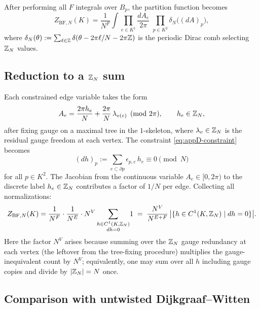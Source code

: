 \medskip

\noindent After performing all $F$ integrals over $B_p$, the partition function becomes
\begin{equation}\label{eq:appD-Z-after-B}
Z_{\mathrm{BF},N}(K)=\frac{1}{N^F}\int\prod_{e\in K^1}\frac{dA_e}{2\pi}\;\prod_{p\in K^2}\delta_{N}\!\bigl((dA)_p\bigr),
\end{equation}
where $\delta_N(\theta):=\sum_{\ell\in\mathbb{Z}}\delta(\theta-2\pi\ell/N-2\pi\mathbb{Z})$ is the periodic Dirac comb selecting $\mathbb{Z}_N$ values.

\subsection{Reduction to a \texorpdfstring{$\mathbb{Z}_N$}{Z\_N} sum}

Each constrained edge variable takes the form
\begin{equation}\label{eq:appD-ZN-parametrize}
A_e=\frac{2\pi h_e}{N}+\frac{2\pi}{N}\,\lambda_{v(e)}\pmod{2\pi},\qquad h_e\in\mathbb{Z}_N,
\end{equation}
after fixing gauge on a maximal tree in the $1$-skeleton, where $\lambda_v\in\mathbb{Z}_N$ is the residual gauge freedom at each vertex. The constraint \eqref{eq:appD-constraint} becomes
\begin{equation}\label{eq:appD-flat-ZN}
(dh)_p:=\sum_{e\subset\partial p}\epsilon_{p,e}\,h_e\equiv 0\pmod{N}
\end{equation}
for all $p\in K^2$. The Jacobian from the continuous variable $A_e\in[0,2\pi)$ to the discrete label $h_e\in\mathbb{Z}_N$ contributes a factor of $1/N$ per edge. Collecting all normalizations:
\begin{equation}\label{eq:appD-Z-discrete}
Z_{\mathrm{BF},N}(K)=\frac{1}{N^F}\cdot\frac{1}{N^E}\cdot N^V\sum_{\substack{h\in C^1(K,\mathbb{Z}_N)\\dh=0}}\!1\;=\;\frac{N^V}{N^{E+F}}\,\bigl|\{h\in C^1(K,\mathbb{Z}_N)\mid dh=0\}\bigr|.
\end{equation}
Here the factor $N^V$ arises because summing over the $\mathbb{Z}_N$ gauge redundancy at each vertex (the leftover from the tree-fixing procedure) multiplies the gauge-inequivalent count by $N^V$; equivalently, one may sum over all $h$ including gauge copies and divide by $|\mathbb{Z}_N|=N$ once.

\subsection{Comparison with untwisted Dijkgraaf--Witten}

